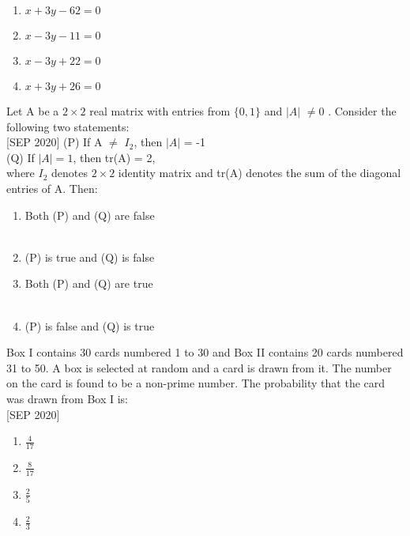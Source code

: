     \begin{multicols}{4}
    \begin{enumerate}
        \item $x+3y-62=0$
        \item $x-3y-11=0$
        \item $x-3y+22=0$
        \item $x+3y+26=0$
    \end{enumerate} 
    \end{multicols}
    \item Let A be a $2\times2$ real matrix with entries from $\{0,1\}$ and $|A|$ $\neq $0 . Consider the following two statements: \\\hfill{[SEP 2020]}
    (P) If A $\neq$ $I_2$, then $|A|$ = -1 \\
    (Q) If $|A|=1$, then tr(A) = 2,\\where $I_2$ denotes $2\times2$ identity matrix and tr(A) denotes the sum of the diagonal entries of A. Then: \\
    \begin{multicols}{2}
    \begin{enumerate}
        \item Both (P) and (Q) are false\\\\
        \item (P) is true and (Q) is false
        \item Both (P) and (Q) are true\\\\
        \item (P) is false and (Q) is true
    \end{enumerate} 
    \end{multicols}
    \item Box I contains 30 cards numbered 1 to 30 and Box II contains 20 cards numbered 31 to 50. A box is selected at random and a card is drawn from it. The number on the card is found to be a non-prime number. The probability that the card was drawn from Box I is: \\\hfill{[SEP 2020]}
    \begin{multicols}{4}
    \begin{enumerate}
        \item $\frac{4}{17}$
        \item $\frac{8}{17}$
        \item $\frac{2}{5}$
        \item $\frac{2}{3}$
    \end{enumerate} 
    \end{multicols}
